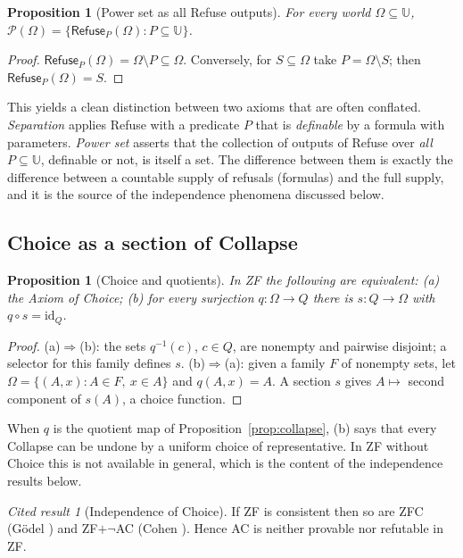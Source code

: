\documentclass[11pt]{article}
\newcommand{\Refuse}{\mathsf{Refuse}}
\newcommand{\U}{\mathbb{U}}
\newcommand{\Om}{\Omega}
\newcommand{\Pow}{\mathcal{P}}
\theoremstyle{definition}
\theoremstyle{plain}
\newtheorem{proposition}[definition]{Proposition}
\theoremstyle{remark}
\newtheorem{cited}[definition]{Cited result}
\begin{document}
\begin{proposition}[Power set as all Refuse outputs]\label{prop:pow}
For every world $\Om\subseteq\U$, $\Pow(\Om)=\{\Refuse_P(\Om):P\subseteq\U\}$.
\end{proposition}
\begin{proof}
$\Refuse_P(\Om)=\Om\setminus P\subseteq\Om$. Conversely, for $S\subseteq\Om$ take $P=\Om\setminus S$; then $\Refuse_P(\Om)=S$.
\end{proof}

This yields a clean distinction between two axioms that are often conflated. \emph{Separation} applies Refuse with a predicate $P$ that is \emph{definable} by a formula with parameters. \emph{Power set} asserts that the collection of outputs of Refuse over \emph{all} $P\subseteq\U$, definable or not, is itself a set. The difference between them is exactly the difference between a countable supply of refusals (formulas) and the full supply, and it is the source of the independence phenomena discussed below.

\subsection{Choice as a section of Collapse}

\begin{proposition}[Choice and quotients]\label{prop:choice-section}
In ZF the following are equivalent: (a) the Axiom of Choice; (b) for every surjection $q:\Om\to Q$ there is $s:Q\to\Om$ with $q\circ s=\mathrm{id}_Q$.
\end{proposition}
\begin{proof}
(a)$\Rightarrow$(b): the sets $q^{-1}(c)$, $c\in Q$, are nonempty and pairwise disjoint; a selector for this family defines $s$. (b)$\Rightarrow$(a): given a family $F$ of nonempty sets, let $\Om=\{(A,x):A\in F,\ x\in A\}$ and $q(A,x)=A$. A section $s$ gives $A\mapsto$ second component of $s(A)$, a choice function.
\end{proof}

When $q$ is the quotient map of Proposition~\ref{prop:collapse}, (b) says that every Collapse can be undone by a uniform choice of representative. In ZF without Choice this is not available in general, which is the content of the independence results below.

\begin{cited}[Independence of Choice]\label{cit:indep}
If ZF is consistent then so are ZFC (G\"odel \cite{Goedel38}) and ZF$+\neg$AC (Cohen \cite{Cohen63}). Hence AC is neither provable nor refutable in ZF.
\end{cited}
\end{document}
